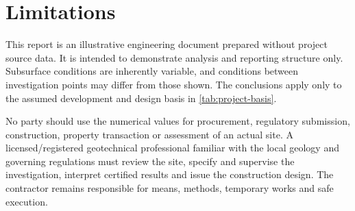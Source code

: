 \section{Limitations}
This report is an illustrative engineering document prepared without project source data. It is
intended to demonstrate analysis and reporting structure only. Subsurface conditions are
inherently variable, and conditions between investigation points may differ from those shown.
The conclusions apply only to the assumed development and design basis in
\cref{tab:project-basis}.

No party should use the numerical values for procurement, regulatory submission, construction,
property transaction or assessment of an actual site. A licensed/registered geotechnical
professional familiar with the local geology and governing regulations must review the site,
specify and supervise the investigation, interpret certified results and issue the construction
design. The contractor remains responsible for means, methods, temporary works and safe execution.

\appendix
\clearpage

